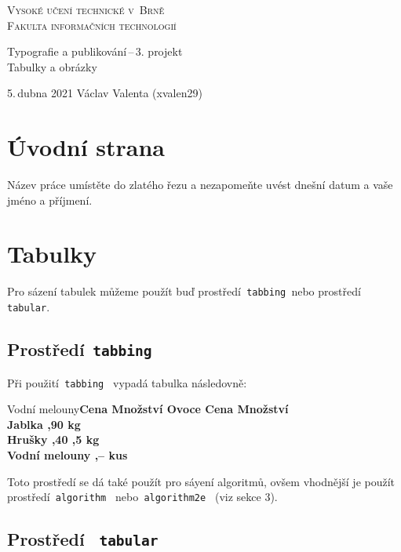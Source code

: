 \documentclass[a4paper, 11pt]{article}
\begin{document}
\begin{titlepage}
\begin{center}
\Huge
\textsc{Vysoké učení technické v~Brně}\\
\huge
\textsc{Fakulta informačních technologií}\\[0.4em]

\LARGE
Typografie a publikování\,--\,3. projekt\\
\Huge
Tabulky a obrázky\\

\Large
5.\,dubna 2021 \hfill Václav Valenta (xvalen29)
\end{center} 
\end{titlepage}

\thispagestyle{plain}
\clearpage

\section{Úvodní strana}
Název práce umístěte do zlatého řezu a nezapomeňte uvést dnešní datum a vaše jméno a příjmení.

\section{Tabulky}
Pro sázení tabulek můžeme použít buď prostředí\texttt{ tabbing }nebo prostředí\texttt{ tabular}.

\subsection{Prostředí\texttt{ tabbing }}
Při použití\texttt{ tabbing } vypadá tabulka následovně:

\begin{tabbing}
Vodní melouny\quad \= \bf Cena \quad \= \bf Množství
\quad \kill
	\bf Ovoce		\>\bf Cena	\>\bf Množství	\\[0.1em]
	Jablka			,90	 kg 		\\
	Hrušky		,40	,5 kg 		\\
	Vodní melouny	,-- 	 kus		\\
\end{tabbing}
\noindent
Toto prostředí se dá také použít pro sáyení algoritmů, ovšem vhodnější je použít prostředí\texttt{ algorithm } nebo\texttt{ algorithm2e } (viz sekce 3).

\subsection{Prostředí \texttt{ tabular}}
\end{document}
